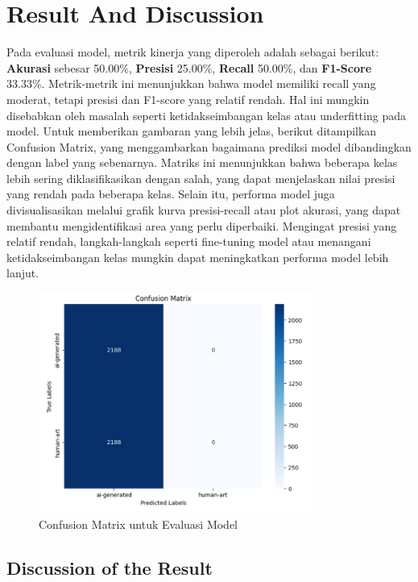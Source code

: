 \documentclass[12pt,a4paper]{article}
\begin{document}
\section{Result And Discussion}
Pada evaluasi model, metrik kinerja yang diperoleh adalah sebagai berikut: \textbf{Akurasi} sebesar 50.00\%, \textbf{Presisi} 25.00\%, \textbf{Recall} 50.00\%, dan \textbf{F1-Score} 33.33\%. Metrik-metrik ini menunjukkan bahwa model memiliki recall yang moderat, tetapi presisi dan F1-score yang relatif rendah. Hal ini mungkin disebabkan oleh masalah seperti ketidakseimbangan kelas atau underfitting pada model. Untuk memberikan gambaran yang lebih jelas, berikut ditampilkan Confusion Matrix, yang menggambarkan bagaimana prediksi model dibandingkan dengan label yang sebenarnya. Matriks ini menunjukkan bahwa beberapa kelas lebih sering diklasifikasikan dengan salah, yang dapat menjelaskan nilai presisi yang rendah pada beberapa kelas. Selain itu, performa model juga divisualisasikan melalui grafik kurva presisi-recall atau plot akurasi, yang dapat membantu mengidentifikasi area yang perlu diperbaiki. Mengingat presisi yang relatif rendah, langkah-langkah seperti fine-tuning model atau menangani ketidakseimbangan kelas mungkin dapat meningkatkan performa model lebih lanjut.

\begin{figure}[h!]
    \centering
    \includegraphics[width=0.8\textwidth]{confus.png} %
    \caption{Confusion Matrix untuk Evaluasi Model}
    \label{fig:confusion_matrix}
\end{figure}
    
\subsection{Discussion of the Result}
\end{document}
